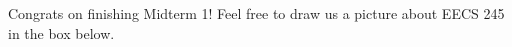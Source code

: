 \documentclass[11pt]{article}
\begin{document}
\newpage

Congrats on finishing Midterm 1! Feel free to draw us a picture about EECS 245 in the box below.

\emptybox{20cm}


\end{document}
